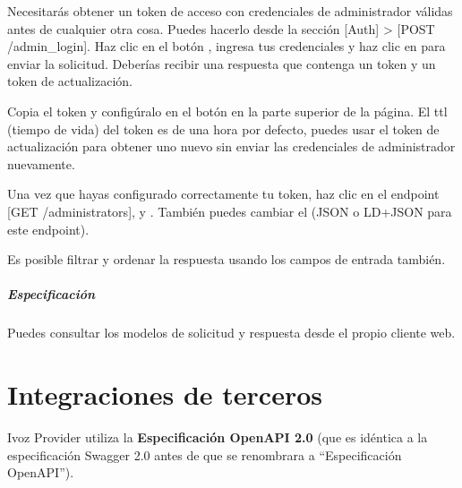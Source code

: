 \documentclass[letterpaper,10pt,spanish]{sphinxmanual}
\begin{document}

Necesitarás obtener un token de acceso con credenciales de administrador válidas antes de cualquier otra cosa. Puedes hacerlo desde la sección {[}Auth{]} \textgreater{} {[}POST /admin\_login{]}. Haz clic en el botón , ingresa tus credenciales y haz clic en  para enviar la solicitud. Deberías recibir una respuesta que contenga un token y un token de actualización.


Copia el token y configúralo en el botón  en la parte superior de la página. El ttl (tiempo de vida) del token es de una hora por defecto, puedes usar el token de actualización para obtener uno nuevo sin enviar las credenciales de administrador nuevamente.

Una vez que hayas configurado correctamente tu token, haz clic en el endpoint {[}GET /administrators{]},  y . También puedes cambiar el  (JSON o LD+JSON para este endpoint).


Es posible filtrar y ordenar la respuesta usando los campos de entrada  también.
\paragraph{Especificación}

Puedes consultar los modelos de solicitud y respuesta desde el propio cliente web.



\chapter{Integraciones de terceros}
\label{api_rest/integrations:third-party-integrations}\label{api_rest/integrations::doc}
Ivoz Provider utiliza la \textbf{Especificación OpenAPI 2.0} (que es idéntica a la especificación Swagger 2.0 antes de que se renombrara a ``Especificación OpenAPI'').
\end{document}
